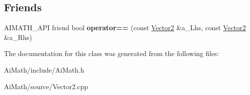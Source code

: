 \subsection*{Friends}
\begin{DoxyCompactItemize}
\item 
\hypertarget{class_ai_math_1_1_vector2_aef301b33b95ede4ebfa62b1156a96371}{A\+I\+M\+A\+T\+H\+\_\+\+A\+P\+I friend bool {\bfseries operator==} (const \hyperlink{class_ai_math_1_1_vector2}{Vector2} \&a\+\_\+\+Lhs, const \hyperlink{class_ai_math_1_1_vector2}{Vector2} \&a\+\_\+\+Rhs)}\label{class_ai_math_1_1_vector2_aef301b33b95ede4ebfa62b1156a96371}

\end{DoxyCompactItemize}


The documentation for this class was generated from the following files\+:\begin{DoxyCompactItemize}
\item 
Ai\+Math/include/Ai\+Math.\+h\item 
Ai\+Math/source/Vector2.\+cpp\end{DoxyCompactItemize}
